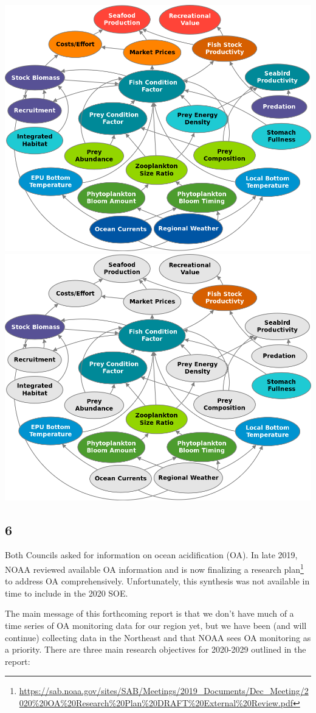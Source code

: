 \documentclass[
  10pt,
]{article}
\let\origfigure\figure
\let\endorigfigure\endfigure
\renewenvironment{figure}[1][2] {
    \expandafter\origfigure\expandafter[H]
} {
    \endorigfigure
}
\begin{document}
\begin{figure}

{\centering \includegraphics[width=0.49\linewidth]{images/SOEconditionfactorlinks_color} \includegraphics[width=0.49\linewidth]{images/SOEconditionfactorlinks_keycolor} 

}

\caption{Full set of hypothesized relationships between SOE indicators related to fish condition (left) and subset to be investigated first (right).}\label{fig:researchlinks}
\end{figure}

\hypertarget{section-5}{%
\subsection{6}\label{section-5}}

Both Councils asked for information on ocean acidification (OA). In late
2019, NOAA reviewed available OA information and is now finalizing a
research plan\footnote{\url{https://sab.noaa.gov/sites/SAB/Meetings/2019_Documents/Dec_Meeting/2020\%20OA\%20Research\%20Plan\%20DRAFT\%20External\%20Review.pdf}}
to address OA comprehensively. Unfortunately, this synthesis was not
available in time to include in the 2020 SOE.

The main message of this forthcoming report is that we don't have much
of a time series of OA monitoring data for our region yet, but we have
been (and will continue) collecting data in the Northeast and that NOAA
sees OA monitoring as a priority. There are three main research
objectives for 2020-2029 outlined in the report:
\end{document}
